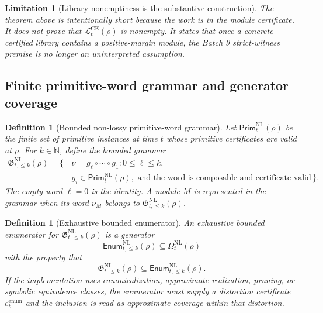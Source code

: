 \documentclass[11pt]{article}
\newtheorem{definition}[theorem]{Definition}
\newtheorem{limitation}[theorem]{Limitation}
\newcommand{\Lcal}{\mathcal{L}}
\newcommand{\1}{\mathbf{1}}
\begin{document}
\begin{limitation}[Library nonemptiness is the substantive construction]
The theorem above is intentionally short because the work is in the module certificate.  It does not prove that \(\Lcal_t^{\mathrm{CE}}(\rho)\) is nonempty.  It states that once a concrete certified library contains a positive-margin module, the Batch 9 strict-witness premise is no longer an uninterpreted assumption.
\end{limitation}

\subsection{Finite primitive-word grammar and generator coverage}

\begin{definition}[Bounded non-lossy primitive-word grammar]
\label{def:batch11_bounded_nl_grammar}
Let \(\mathsf{Prim}_t^{\mathrm{NL}}(\rho)\) be the finite set of primitive instances at time \(t\) whose primitive certificates are valid at \(\rho\).  For \(k\in\mathbb N\), define the bounded grammar
\[
\begin{aligned}
\mathfrak G_{t,\le k}^{\mathrm{NL}}(\rho)
=
\{\,&
\nu=g_\ell\circ\cdots\circ g_1:
0\le \ell\le k,\\
&g_i\in\mathsf{Prim}_t^{\mathrm{NL}}(\rho),
\text{ and the word is composable and certificate-valid}\,\}.
\end{aligned}
\]
The empty word \(\ell=0\) is the identity.  A module \(M\) is represented in the grammar when its word \(\nu_M\) belongs to \(\mathfrak G_{t,\le k}^{\mathrm{NL}}(\rho)\).
\end{definition}

\begin{definition}[Exhaustive bounded enumerator]
\label{def:batch11_exhaustive_bounded_enumerator}
An exhaustive bounded enumerator for \(\mathfrak G_{t,\le k}^{\mathrm{NL}}(\rho)\) is a generator
\[
\mathsf{Enum}_{t,\le k}^{\mathrm{NL}}(\rho)
\subseteq
\Omega_t^{\mathrm{NL}}(\rho)
\]
with the property that
\[
\mathfrak G_{t,\le k}^{\mathrm{NL}}(\rho)
\subseteq
\mathsf{Enum}_{t,\le k}^{\mathrm{NL}}(\rho).
\]
If the implementation uses canonicalization, approximate realization, pruning, or symbolic equivalence classes, the enumerator must supply a distortion certificate \(e_t^{\mathrm{enum}}\) and the inclusion is read as approximate coverage within that distortion.
\end{definition}
\end{document}

